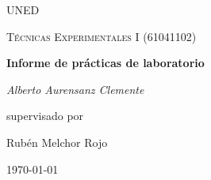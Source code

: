 \documentclass[12pt,a4paper,spanish]{report}
\begin{document}
    \begin{titlepage}
        \centering
        {\LARGE \textsc{UNED}\par}
        \vspace{1cm}
        {\Large \textsc{Técnicas Experimentales I (61041102)}\par}
        \vspace{1.5cm}
        {\huge\bfseries Informe de prácticas de laboratorio\par}
        \vspace{2cm}
        {\Large\itshape Alberto Aurensanz Clemente\par}
        \vfill
        supervisado por\par
        Rubén Melchor Rojo

        \vfill

        {\large \today\par}
    \end{titlepage}
\end{document}

